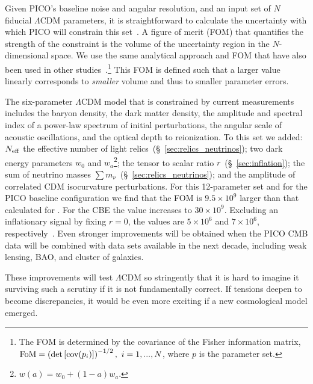 \documentclass[PICOReport.tex]{subfiles}
\begin{document}
Given PICO's baseline noise and angular resolution, and an input set of $N$ fiducial $\Lambda$CDM parameters, it is straightforward to calculate the uncertainty with which PICO will constrain this set~\citep{core_parameter}. A figure of merit (FOM) that quantifies the strength of the constraint is the volume of the uncertainty region in the $N$-dimensional space. We use the same analytical approach and FOM that have also been used in other studies~\citep{core_parameter,Wang2008,pdg2018,Namikawa2010}.\footnote{The FOM is determined by the covariance of the Fisher information matrix, ${\rm FoM} = \left( \det \left[ \mbox{cov} ( p_i)  \right] \right)^{-1/2},\,\, i=1, ..., N$, where $p$ is the parameter set.} This FOM is defined such that a larger value linearly corresponds to {\it smaller} volume and thus to smaller parameter errors. 

The six-parameter $\Lambda$CDM model that is constrained by current measurements includes the baryon density, the dark matter density, the amplitude and spectral index of a power-law spectrum of initial perturbations, the angular scale of acoustic oscillations, and the optical depth to reionization. To this set we added: $N_{\rm eff}$ the effective number of light relics~(\S~\ref{sec:relics_neutrinos}); two dark energy parameters $w_{0}$ and $w_{a}$\footnote{$w(a) = w_{0} + (1-a)w_{a}$.}; the tensor to scalar ratio $r$~(\S~\ref{sec:inflation}); the sum of neutrino masses $\sum m_{\nu}$~(\S~\ref{sec:relics_neutrinos}); and the amplitude of correlated CDM isocurvature perturbations. For this 12-parameter set and for the PICO baseline configuration we find that the FOM is $9.5\times10^{9}$ larger than that calculated for \planck . For the CBE the value increases to $30\times10^{9}$. Excluding an inflationary signal by fixing $r=0$, the values are $5\times10^{6}$ and $7\times10^{6}$, respectively~\citep{picoweb_lcdm}.  Even stronger improvements will be obtained when the PICO CMB data will be combined with data sets available in the next decade, including weak lensing, BAO, and cluster of galaxies. 
 
These improvements will test $\Lambda$CDM so stringently that it is hard to imagine it surviving such a scrutiny if it is not fundamentally correct. If tensions deepen to become discrepancies, it would be even more exciting if a new cosmological model emerged. 

\end{document}
